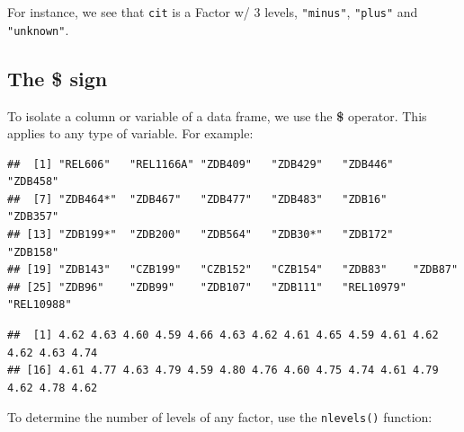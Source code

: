 \documentclass[
]{book}
\newenvironment{Shaded}{\begin{snugshade}}{\end{snugshade}}
\newcommand{\FunctionTok}[1]{\textcolor[rgb]{0.00,0.00,0.00}{#1}}
\newcommand{\NormalTok}[1]{#1}
\newcommand{\SpecialCharTok}[1]{\textcolor[rgb]{0.00,0.00,0.00}{#1}}
\begin{document}
For instance, we see that \texttt{cit} is a Factor w/ 3 levels, \texttt{"minus"}, \texttt{"plus"} and \texttt{"unknown"}.

\hypertarget{the-sign}{%
\subsection*{The \$ sign}\label{the-sign}}

To isolate a column or variable of a data frame, we use the \textbf{\$} operator. This applies to any type of variable. For example:

\begin{Shaded}
\end{Shaded}

\begin{verbatim}
##  [1] "REL606"   "REL1166A" "ZDB409"   "ZDB429"   "ZDB446"   "ZDB458"  
##  [7] "ZDB464*"  "ZDB467"   "ZDB477"   "ZDB483"   "ZDB16"    "ZDB357"  
## [13] "ZDB199*"  "ZDB200"   "ZDB564"   "ZDB30*"   "ZDB172"   "ZDB158"  
## [19] "ZDB143"   "CZB199"   "CZB152"   "CZB154"   "ZDB83"    "ZDB87"   
## [25] "ZDB96"    "ZDB99"    "ZDB107"   "ZDB111"   "REL10979" "REL10988"
\end{verbatim}

\begin{Shaded}
\end{Shaded}

\begin{verbatim}
##  [1] 4.62 4.63 4.60 4.59 4.66 4.63 4.62 4.61 4.65 4.59 4.61 4.62 4.62 4.63 4.74
## [16] 4.61 4.77 4.63 4.79 4.59 4.80 4.76 4.60 4.75 4.74 4.61 4.79 4.62 4.78 4.62
\end{verbatim}

To determine the number of levels of any factor, use the \texttt{nlevels()} function:

\begin{Shaded}
\end{Shaded}
\end{document}

